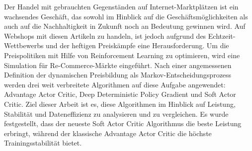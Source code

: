 Der Handel mit gebrauchten Gegenständen auf Internet-Marktplätzen ist ein wachsendes Geschäft, das sowohl im Hinblick auf die Geschäftsmöglichkeiten als auch auf die Nachhaltigkeit in Zukunft noch an Bedeutung gewinnen wird.
Auf Webshops mit diesen Artikeln zu handeln, ist jedoch aufgrund des Echtzeit-Wettbewerbs und der heftigen Preiskämpfe eine Herausforderung.
Um die Preispolitiken mit Hilfe von Reinforcement Learning zu optimieren, wird eine Simulation für Re-Commerce-Märkte eingeführt.
Nach einer angemessenen Definition der dynamischen Preisbildung als Markov-Entscheidungsprozess werden drei weit verbreitete Algorithmen auf diese Aufgabe angewendet:
Advantage Actor Critic, Deep Deterministic Policy Gradient und Soft Actor Critic.
Ziel dieser Arbeit ist es, diese Algorithmen im Hinblick auf Leistung, Stabilität und Dateneffizienz zu analysieren und zu vergleichen.
Es wurde festgestellt, dass der neueste Soft Actor Critic Algorithmus die beste Leistung erbringt, während der klassische Advantage Actor Critic die höchste Trainingsstabilität bietet.
